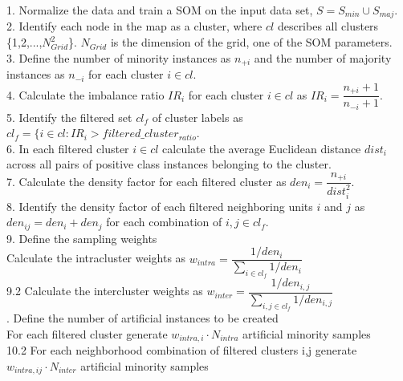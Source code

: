 \documentclass[parskip=full]{scrartcl}
\begin{document}
\begin{algorithm}[H]
	1. Normalize the data and train a SOM on the input data set, $S = S_{min} \cup S_{maj}$. \\
	2. Identify each node in the map as a cluster, where $cl$ describes all clusters \{1,2,...,$N_{Grid}^2$\}. $N_{Grid}$ is the dimension of the grid, one of the SOM parameters. \\
	3. Define the number of minority instances as $n_{+i}$ and the number of majority instances as $n_{-i}$ for each cluster $i \in cl$. \\
	4. Calculate the imbalance ratio $IR_{i}$ for each cluster $i \in cl$ as $IR_{i} = \dfrac{n_{+i} +1}{n_{-i} +1}$.\\
	5. Identify the filtered set $cl_{f}$ of cluster labels as $cl_{f} = \{i \in cl: IR_{i} > filtered\_cluster_{ratio}$. \\
	6. In each filtered cluster $i \in cl$ calculate the average Euclidean distance $dist_{i}$ across all pairs of positive class instances belonging to the cluster. \\ 
	7. Calculate the density factor for each filtered cluster as $den_{i} = \dfrac{n_{+i}}{dist_{i}^2}$. \\
	8. Identify the density factor of each filtered neighboring units $i$ and $j$ as $den_{ij} = den_{i} + den_{j}$ for each combination of $i, j \in cl_{f}$. \\
	9. Define the sampling weights\\
	 Calculate the intracluster weights as $w_{intra} = \dfrac{1 / den_{i}}{\sum_{i \in cl_{f}} 1/den_{i}}$ \\
		9.2 Calculate the intercluster weights as $w_{inter} = \dfrac{1 / den_{i,j}}{\sum_{i,j \in cl_{f}} 1/den_{i,j}}$ \\
	. Define the number of artificial instances to be created \\
	 For each filtered cluster generate $w_{intra, i} \cdot N_{intra}$ artificial minority samples \\
		10.2 For each neighborhood combination of filtered clusters i,j generate $w_{intra, ij} \cdot N_{inter}$ artificial minority samples\\
	\Indm
	

\end{algorithm}
\end{document}
